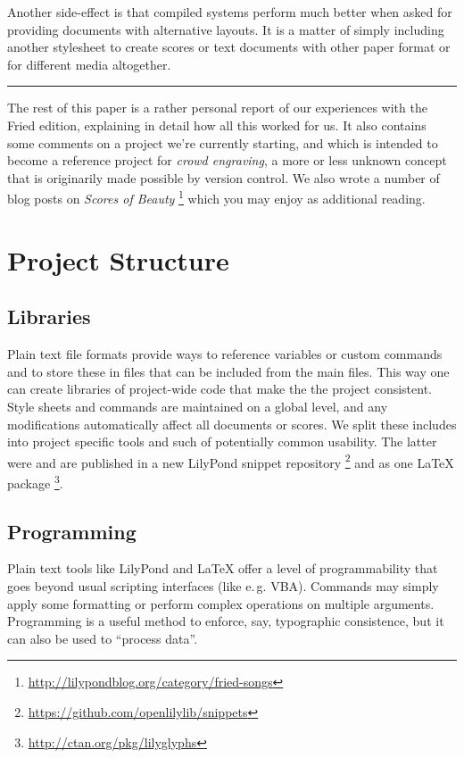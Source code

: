 \documentclass[11pt,a4paper]{article}
\begin{document}
Another side-effect is that compiled systems perform much better when asked for providing
documents with alternative layouts. It is a matter of simply including another stylesheet
to create scores or text documents with other paper format or for different media altogether.

\bigskip
\hrule

\bigskip
The rest of this paper is a rather personal report of our experiences with the Fried
edition, explaining in detail how all this worked for us.  It also contains
some comments on a project we're currently starting, and which is intended to become
a reference project for \emph{crowd engraving}, a more or less unknown concept that is
originarily made possible by version control. We also wrote a number of blog posts on
\emph{Scores of Beauty}%
\footnote{\url{http://lilypondblog.org/category/fried-songs}}
which you may enjoy as additional reading.

\section{Project Structure}


\subsection{Libraries}
Plain text file formats provide ways to reference variables or custom
commands and to store these in files that can be included from the
main files. This way one can create libraries of project-wide code
that make the the project consistent. Style sheets and commands are
maintained on a global level, and any modifications automatically
affect all documents or scores.
We split these includes into project specific tools and such of potentially
common usability. The latter were and are published in a new LilyPond snippet
repository%
\footnote{\url{https://github.com/openlilylib/snippets}}
and as one \LaTeX{} package%
\footnote{\url{http://ctan.org/pkg/lilyglyphs}}.

\subsection{Programming}
Plain text tools like LilyPond and \LaTeX{} offer a level of programmability that
goes beyond usual scripting interfaces (like e.\,g. VBA). Commands may simply apply
some formatting or perform complex operations on multiple arguments.
Programming is a useful method to enforce, say, typographic consistence, but it can
also be used to “process data”.
\end{document}
